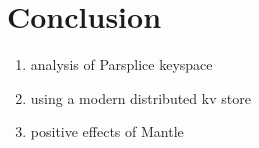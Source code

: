 \section{Conclusion}

\begin{enumerate}
  \item analysis of Parsplice keyspace
  \item using a modern distributed kv store
  \item positive effects of Mantle
\end{enumerate}
